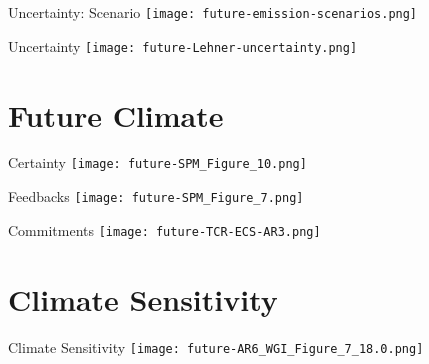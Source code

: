 \begin{frame}{Uncertainty: Scenario}
    \centering
    \texttt{[image: future-emission-scenarios.png]}
\end{frame}

\begin{frame}{Uncertainty}
    \centering
    \texttt{[image: future-Lehner-uncertainty.png]}


\end{frame}

\section{Future Climate}

\begin{frame}{Certainty}
    \centering
    \texttt{[image: future-SPM\_Figure\_10.png]}
\end{frame}

\begin{frame}{Feedbacks}
    \centering
    \texttt{[image: future-SPM\_Figure\_7.png]}
\end{frame}

\begin{frame}{Commitments}
    \centering
    \texttt{[image: future-TCR-ECS-AR3.png]}
\end{frame}

\section{Climate Sensitivity}

\begin{frame}{Climate Sensitivity}
    \centering
    \texttt{[image: future-AR6\_WGI\_Figure\_7\_18.0.png]}
\end{frame}


